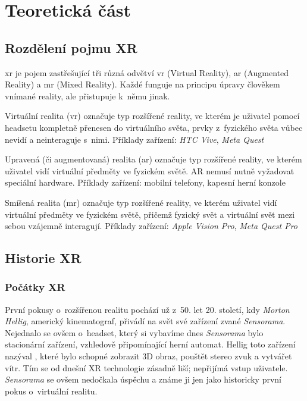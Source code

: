 \part{Teoretická část}

\chapter{Rozdělení pojmu XR}

\gls{xr} je pojem zastřešující tři různá odvětví \poml \gls{vr} (Virtual Reality), \gls{ar} (Augmented Reality) a \gls{mr} (Mixed Reality). Každé funguje na principu úpravy člověkem vnímané reality, ale přistupuje k~němu jinak.

Virtuální realita (\gls{vr}) označuje typ rozšířené reality, ve kterém je uživatel pomocí headsetu kompletně přenesen do virtuálního světa, prvky z~fyzického světa vůbec nevidí a neinteraguje s~nimi. Příklady zařízení: \textit{HTC Vive}, \textit{Meta Quest}

Upravená (či augmentovaná) realita (\gls{ar}) označuje typ rozšířené reality, ve kterém uživatel vidí virtuální předměty ve fyzickém světě. AR nemusí nutně vyžadovat speciální hardware. Příklady zařízení: mobilní telefony, kapesní herní konzole

Smíšená realita (\gls{mr}) označuje typ rozšířené reality, ve kterém uživatel vidí virtuální předměty ve fyzickém světě, přičemž fyzický svět a virtuální svět mezi sebou vzájemně interagují. Příklady zařízení: \textit{Apple Vision Pro}, \textit{Meta Quest Pro} \cite{xr_disambiguation}

\chapter{Historie XR}

\section{Počátky XR}

První pokusy o~rozšířenou realitu pochází už z~50. let 20. století, kdy \textit{Morton Hellig}, americký kinematograf, přivádí na svět své zařízení zvané \textit{Sensorama}. Nejednalo se ovšem o~headset, který si vybavíme dnes \poml \textit{Sensorama} bylo stacionární zařízení, vzhledově připomínající herní automat. Hellig toto zařízení nazýval , které bylo schopné zobrazit 3D obraz, pouštět stereo zvuk a vytvářet vítr. Tím se od dnešní XR technologie zásadně liší; nepřijímá vstup uživatele. \textit{Sensorama} se ovšem nedočkala úspěchu a známe ji jen jako historicky první pokus o~virtuální realitu. \cite{otechnice}

